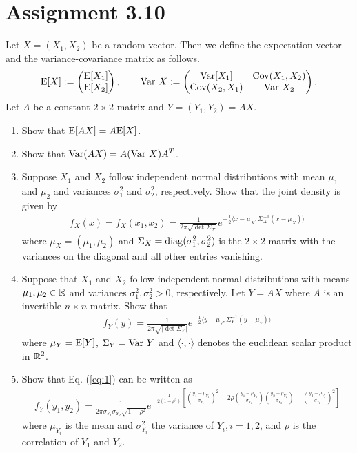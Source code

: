 \section*{Assignment 3.10}

Let $X = (X_1, X_2)$ be a random vector. Then we define the expectation vector and the variance-covariance matrix as follows.
\begin{align*}
\mathrm{E}[X] := \begin{pmatrix}
\mathrm{E}[X_1] \\ \mathrm{E}[X_2]
\end{pmatrix}, \qquad \mathrm{Var}\ X := \begin{pmatrix}
\mathrm{Var}[X_1] & \mathrm{Cov}(X_1, X_2) \\
\mathrm{Cov}(X_2, X_1) & \mathrm{Var}\ X_2
\end{pmatrix}.
\end{align*}
Let $A$ be a constant $2\times 2$ matrix and $Y = (Y_1, Y_2) = AX$.
\begin{enumerate}
	\item Show that $\mathrm{E}[AX] = A\mathrm{E}[X]$.
	\item Show that $\U{Var}(AX) = A(\U{Var}\ X)A^T$.
	\item Suppose $X_1$ and $X_2$ follow independent normal distributions with mean $\mu_1$ and $\mu_2$ and variances $\sigma_1^2$ and $\sigma_2^2$, respectively. Show that the joint density is given by
	\begin{align*}
	f_X(x) = f_X(x_1, x_2) = \frac{1}{2\pi \sqrt{\det\Sigma_X}} e^{-\frac{1}{2}\langle x - \mu_X, \Sigma_X^{-1}(x - \mu_X) \rangle}
	\end{align*}
	where $\mu_X = (\mu_1, \mu_2)$ and $\Sigma_X = \mathrm{diag}(\sigma_1^2, \sigma_2^2)$ is the $2\times 2$ matrix with the variances on the diagonal and all other entries vanishing.
	\item  Suppose that $X_1$ and $X_2$ follow independent normal distributions with means $\mu_1, \mu_2\in \mathbb{R}$ and variances $\sigma_1^2, \sigma_2^2 > 0$, respectively. Let $Y = AX$ where $A$ is an invertible $n\times n$ matrix. Show that
	\begin{align}\label{eq:1}
	f_Y(y) = \frac{1}{2\pi\sqrt{|\det \Sigma_Y}|} e^{-\frac{1}{2}\langle y - \mu_Y, \Sigma_Y^{-1}(y-\mu_Y)\rangle}
	\end{align}
	where $\mu_Y = \mathrm{E}[Y]$, $\Sigma_Y = \mathrm{Var}\ Y$ and $\langle \cdot, \cdot\rangle$ denotes the euclidean scalar product in $\mathbb{R}^2$.
	\item Show that Eq. (\ref{eq:1}) can be written as
	\begin{align*}
	f_Y(y_1, y_2) = \frac{1}{2\pi \sigma_{Y_1}\sigma_{Y_2}\sqrt{1-\rho^2}} e^{-\frac{1}{2(1-\rho^2)}\left[\left(\frac{y_1 - \mu_{Y_1}}{\sigma_{Y_1}} \right)^2 - 2\rho\left(\frac{y_1-\mu_{Y_1}}{\sigma_{Y_1}} \right)\left(\frac{y_2 - \mu_{Y_2}}{\sigma_{Y_2}} \right) + \left(\frac{y_2 - \mu_{Y_2}}{\sigma_{Y_2}} \right)^2 \right]}
	\end{align*}
	where $\mu_{Y_i}$ is the mean and $\sigma_{Y_i}^2$ the variance of $Y_i, i = 1, 2$, and $\rho$ is the correlation of $Y_1$ and $Y_2$.
\end{enumerate}
